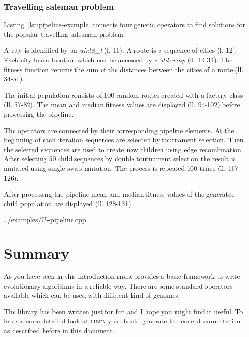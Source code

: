 \documentclass[a4paper]{article}
\begin{document}
\subsubsection*{Travelling saleman problem}

Listing~\ref{lst:pipeline-example} connects four genetic operators to find solutions for the popular travelling salesman problem.

A city is identified by an \textit{uint8\_t} (l. 11). A route is a sequence of cities (l. 12). Each city has a location which can be accessed by a \textit{std::map} (ll. 14-31). The fitness function returns the sum of the distances between the cities of a route (ll. 34-51).

The initial population consists of 100 random routes created with a factory class (ll. 57-82). The mean and median fitness values are displayed (ll. 94-102) before processing the pipeline.

The operators are connected by their corresponding pipeline elements. At the beginning of each iteration sequences are selected by tournament selection. Then the selected sequences are used to create new children using edge recombination. After selecting 50 child sequences by double tournament selection the result is mutated using single swap mutation. The process is repeated 100 times (ll. 107-126).

After processing the pipeline mean and median fitness values of the generated child population are displayed (ll. 128-131).

\begin{lstinputlisting}[caption=pipeline operators,label=lst:pipeline-example]{../examples/05-pipeline.cpp}
\end{lstinputlisting}

\section{Summary}

As you have seen in this introduction \textsc{libea} provides a basic framework to write evolutionary algorithms in a reliable way. There are some standard operators available which can be used with different kind of genomes.

The library has been written just for fun and I hope you might find it useful. To have a more detailed look at \textsc{libea} you should generate the code documentation as described before in this document.
\end{document}
